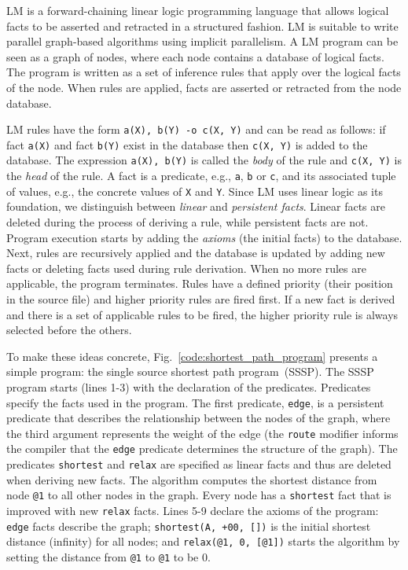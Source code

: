 \newcommand{\mytt}[1]{\texttt{#1}}
\newcommand{\comprehension}[3]{\{ \; #1; \; #2; \; #3 \; \}}
\newcommand{\aggregate}[6]{[\; #1 \Rightarrow #2; \; #3; \; #4; \; #5; \; #6 \;]}

LM is a forward-chaining linear logic programming language that allows logical
facts to be asserted and retracted in a structured fashion. LM is suitable to
write parallel graph-based algorithms using implicit parallelism.
A LM program can be seen as a graph of nodes, where each node contains a
database of logical facts. The program is written as a set of inference rules
that apply over the logical facts of the node. When rules are applied, facts are
asserted or retracted from the node database.

LM rules have the form \mytt{a(X), b(Y) -o c(X, Y)} and can be read as follows:
if fact \mytt{a(X)} and fact \mytt{b(Y)} exist in the database then \mytt{c(X,
      Y)} is added to the database. The expression \mytt{a(X), b(Y)} is called
the \emph{body} of the rule and \mytt{c(X, Y)} is the \emph{head} of the rule.
A fact is a predicate, e.g., \mytt{a}, \mytt{b} or \mytt{c}, and its associated
tuple of values, e.g., the concrete values of \mytt{X} and \mytt{Y}. Since LM
uses linear logic as its foundation, we distinguish between \emph{linear} and
\emph{persistent facts}. Linear facts are deleted during the process of deriving
a rule, while persistent facts are not.  Program execution starts by adding the
\emph{axioms} (the initial facts) to the database. Next, rules are recursively
applied and the database is updated by adding new facts or deleting facts used
during rule derivation.  When no more rules are applicable, the program
terminates. Rules have a defined priority (their position in the source file)
and higher priority rules are fired first. If a new fact is derived and there is
a set of applicable rules to be fired, the higher priority rule is always
selected before the others.

To make these ideas concrete, Fig.~\ref{code:shortest_path_program} presents
a simple program: the single source shortest path program~(SSSP).
The SSSP program starts (lines 1-3) with the declaration of the predicates.
Predicates specify the facts used in the program. The first predicate,
\mytt{edge}, is a persistent predicate that describes the
relationship between the nodes of the graph, where the third argument
represents the weight of the edge (the \mytt{route} modifier
informs the compiler that the \mytt{edge} predicate
determines the structure of the graph).  The predicates
\mytt{shortest} and \mytt{relax} are specified as linear facts
and thus are deleted when deriving new facts.  The algorithm computes
the shortest distance from node \mytt{@1} to all other nodes in the
graph. Every node has a \mytt{shortest} fact that is improved with
new \mytt{relax} facts.  Lines 5-9 declare the axioms of the
program: \mytt{edge} facts describe the graph; \mytt{shortest(A,
+00, [])} is the initial shortest distance (infinity) for all
nodes; and \mytt{relax(@1, 0, [@1])} starts the algorithm by
setting the distance from \mytt{@1} to \mytt{@1} to be 0.

